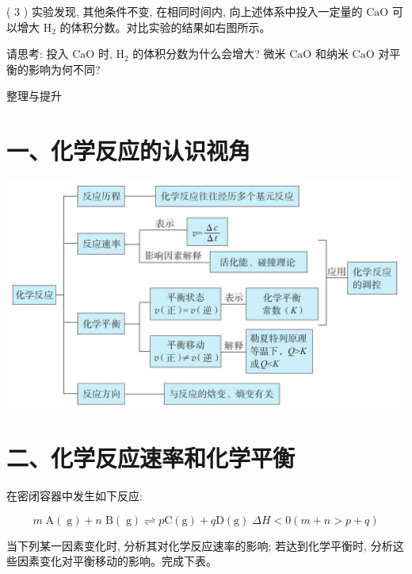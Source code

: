 \documentclass[10pt]{article}
\begin{document}
( 3 ) 实验发现, 其他条件不变, 在相同时间内, 向上述体系中投入一定量的 \(\mathrm{{CaO}}\) 可以增大 \({\mathrm{H}}_{2}\) 的体积分数。对比实验的结果如右图所示。

请思考: 投入 \(\mathrm{{CaO}}\) 时, \({\mathrm{H}}_{2}\) 的体积分数为什么会增大? 微米 \(\mathrm{{CaO}}\) 和纳米 \(\mathrm{{CaO}}\) 对平衡的影响为何不同?

整理与提升

\section*{一、化学反应的认识视角}

\begin{center}
\includegraphics[max width=1.0\textwidth]{images/0190da9d-8bfd-732f-bc2c-0b21d0f13b91_57_467541.jpg}
\end{center}

\section*{二、化学反应速率和化学平衡}

在密闭容器中发生如下反应:

\[
m\mathrm{\;A}\left( \mathrm{\;g}\right) + n\mathrm{\;B}\left( \mathrm{\;g}\right) \rightleftharpoons p\mathrm{C}\left( \mathrm{g}\right) + q\mathrm{D}\left( \mathrm{g}\right) \;{\Delta H} < 0\left( {m + n > p + q}\right)
\]

当下列某一因素变化时, 分析其对化学反应速率的影响; 若达到化学平衡时, 分析这些因素变化对平衡移动的影响。完成下表。

\begin{center}
\end{center}
\end{document}
